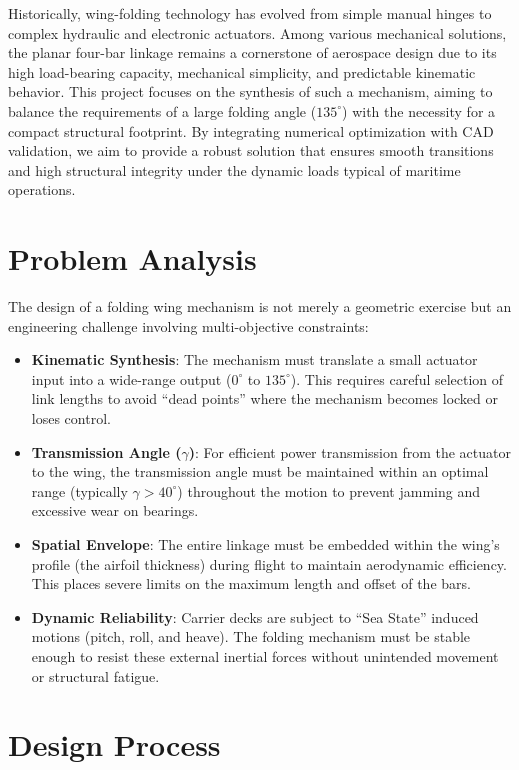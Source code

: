 \documentclass[11pt,a4paper]{article}
\begin{document}
Historically, wing-folding technology has evolved from simple manual hinges to complex hydraulic and electronic actuators. Among various mechanical solutions, the planar four-bar linkage remains a cornerstone of aerospace design due to its high load-bearing capacity, mechanical simplicity, and predictable kinematic behavior. This project focuses on the synthesis of such a mechanism, aiming to balance the requirements of a large folding angle ($135^\circ$) with the necessity for a compact structural footprint. By integrating numerical optimization with CAD validation, we aim to provide a robust solution that ensures smooth transitions and high structural integrity under the dynamic loads typical of maritime operations.

\section{Problem Analysis}

The design of a folding wing mechanism is not merely a geometric exercise but an engineering challenge involving multi-objective constraints:

\begin{itemize}
    \item \textbf{Kinematic Synthesis}: The mechanism must translate a small actuator input into a wide-range output ($0^\circ$ to $135^\circ$). This requires careful selection of link lengths to avoid ``dead points'' where the mechanism becomes locked or loses control.
    \item \textbf{Transmission Angle ($\gamma$)}: For efficient power transmission from the actuator to the wing, the transmission angle must be maintained within an optimal range (typically $\gamma > 40^\circ$) throughout the motion to prevent jamming and excessive wear on bearings.
    \item \textbf{Spatial Envelope}: The entire linkage must be embedded within the wing's profile (the airfoil thickness) during flight to maintain aerodynamic efficiency. This places severe limits on the maximum length and offset of the bars.
    \item \textbf{Dynamic Reliability}: Carrier decks are subject to ``Sea State'' induced motions (pitch, roll, and heave). The folding mechanism must be stable enough to resist these external inertial forces without unintended movement or structural fatigue.
\end{itemize}

\section{Design Process}
\end{document}
